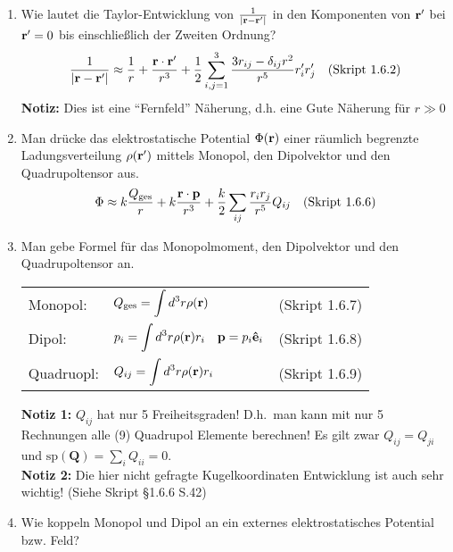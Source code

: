\documentclass{scrartcl}
\newcommand{\rr}[1]{\frac{#1}{\abs{\vb{r}-\vb{r}'}}}
\newcommand{\ds}{\displaystyle}
\newcommand{\sref}[1]{(Skript #1)}
\newcommand{\smref}[1]{\quad\text{(Skript #1)}}
\begin{document}
  \begin{enumerate}

    \item Wie lautet die Taylor-Entwicklung von $\rr{1}$ in den Komponenten
          von $\vb r'$ bei $\vb r'=0$ bis einschließlich der Zweiten
          Ordnung?
          $$ 
          \rr{1}\approx \frac{1}{r}+\frac{\vb r\cdot\vb r'}{r^3} +
          \frac{1}{2}\sum_{i,j=1}^3\frac{3r_{ij}-\delta_{ij}r^2}{r^5}
          r_i'r_j'
          \quad\text{(Skript 1.6.2)}$$
          \textbf{Notiz:} Dies ist eine ``Fernfeld'' Näherung, d.h. 
          eine Gute Näherung für $r\gg 0$

    \item Man drücke das elektrostatische Potential $\Phi(\vb r)$ einer
          räumlich begrenzte Ladungsverteilung $\rho(\vb r')$ mittels
          Monopol, den Dipolvektor und den Quadrupoltensor aus.
          $$
          \Phi\approx k\frac{Q_\text{ges}}{r} +
          k\frac{\vb r\cdot \vb p}{r^3} +
          \frac{k}{2} \sum_{ij}\frac{r_ir_j}{r^5}Q_{ij}
          \smref{1.6.6}$$

    \item Man gebe Formel für das Monopolmoment, den Dipolvektor und den
          Quadrupoltensor an.
          \begin{center}
          \begin{tabular}{lll}
            Monopol:    & $\ds Q_{\text{ges}}=\int d^3r\rho(\vb r)$
                          &\sref{1.6.7}\\
            Dipol:      & $\ds p_i=\int d^3r\rho(\vb r)r_i
                          \quad\vb p=p_i\vu{e}_i $
                          &\sref{1.6.8}\\
            Quadruopl:  & $\ds Q_{ij}=\int d^3r\rho(\vb r)r_i$
                          &\sref{1.6.9}\\
          \end{tabular}
          \end{center}
          \textbf{Notiz 1:} $Q_{ij}$ hat nur 5 Freiheitsgraden! D.h.\ man kann           mit nur 5 Rechnungen alle (9) Quadrupol Elemente berechnen! Es
          gilt zwar $Q_{ij}=Q_{ji}$ und 
          $\text{sp}(\bm Q)=\sum_i Q_{ii}=0$.\\
          \textbf{Notiz 2:} Die hier nicht gefragte Kugelkoordinaten
          Entwicklung ist auch sehr wichtig! (Siehe Skript §1.6.6 S.42)

    \item Wie koppeln Monopol und Dipol an ein externes elektrostatisches
          Potential bzw. Feld?
          

\end{enumerate}
\end{document}

